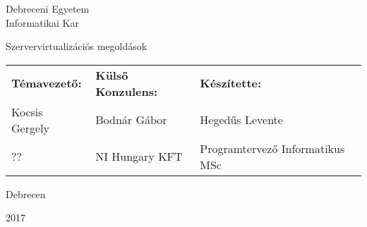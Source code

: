 \documentclass{memoir}
\begin{document}
\Large
\begin{center}
Debreceni Egyetem\\
Informatikai Kar
\end{center}

\vspace*{\fill}
\begin{vplace}[0.9]
\begin{center}
\HUGE
Szervervirtualizációs megoldások
\end{center}
\end{vplace}

\Large
\begin{tabu} to \linewidth{ X[c] X[c] X[c] }
\textbf{Témavezető:} & \textbf{Külső Konzulens:} & \textbf{ Készítette: }\\ 
Kocsis Gergely & Bodnár Gábor & Hegedűs Levente \\
?? & NI Hungary KFT & Programtervező Informatikus MSc \\
\end{tabu}


\vspace*{100pt}
\LARGE{
\begin{center}
Debrecen

2017
\end{center}
}
\end{document}
